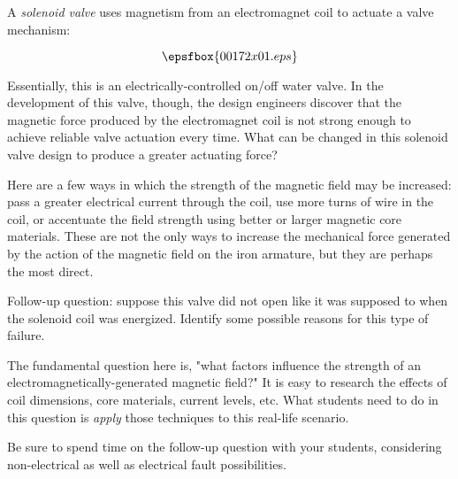 

A {\it solenoid valve} uses magnetism from an electromagnet coil to actuate a valve mechanism:

$$\epsfbox{00172x01.eps}$$

Essentially, this is an electrically-controlled on/off water valve.  In the development of this valve, though, the design engineers discover that the magnetic force produced by the electromagnet coil is not strong enough to achieve reliable valve actuation every time.  What can be changed in this solenoid valve design to produce a greater actuating force?







Here are a few ways in which the strength of the magnetic field may be increased: pass a greater electrical current through the coil, use more turns of wire in the coil, or accentuate the field strength using better or larger magnetic core materials.  These are not the only ways to increase the mechanical force generated by the action of the magnetic field on the iron armature, but they are perhaps the most direct.

\vskip 10pt

Follow-up question: suppose this valve did not open like it was supposed to when the solenoid coil was energized.  Identify some possible reasons for this type of failure.







The fundamental question here is, "what factors influence the strength of an electromagnetically-generated magnetic field?"  It is easy to research the effects of coil dimensions, core materials, current levels, etc.  What students need to do in this question is {\it apply} those techniques to this real-life scenario.

Be sure to spend time on the follow-up question with your students, considering non-electrical as well as electrical fault possibilities.




